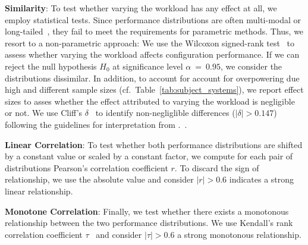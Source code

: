 \begin{compactenum}
	\item \textbf{Similarity}: To test whether varying the workload has any effect at all, we employ statistical tests. Since performance distributions are often multi-modal or long-tailed~\cite{curtsinger_stabilizer_2013,maricq2018taming}, they fail to meet the requirements for parametric methods. 
	Thus, we resort to a non-parametric approach: We use the Wilcoxon signed-rank test~\cite{lovric_international_2010} to assess whether varying the workload affects configuration performance. If we can reject the null hypothesis $H_0$ at significance level $\alpha~=~0.95$, we consider the distributions dissimilar. In addition, to account for account for overpowering due high and different sample sizes (cf.~Table~\ref{tab:subject_systems}), we report effect sizes to asses whether the effect attributed to varying the workload is negligible or not. We use Cliff's $\delta$~\cite{Cliff1993DominanceSO} to identify non-negliglible differences ($\vert \delta \vert > 0.147$) following the guidelines for interpretation from \citeauthor{romano2006exploring}.~\cite{romano2006exploring}.
	
	\item \textbf{Linear Correlation}: To test whether both performance distributions are shifted by a constant value or scaled by a constant factor, we compute for each pair of distributions Pearson's correlation coefficient $r$. To discard the sign of relationship, we use the absolute value and consider $\vert r\vert >0.6$ indicates a strong linear relationship. 
	
	\item \textbf{Monotone Correlation}: Finally, we test whether there exists a monotonous relationship between the two performance distributions. We use Kendall's rank correlation coefficient $\tau$~\cite{kendall1938new} and consider $\vert\tau\vert > 0.6$ a strong monotonous relationship.
\end{compactenum}

